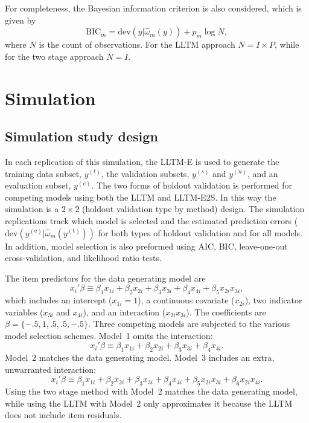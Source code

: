 For completeness, the Bayesian information criterion \parencite[BIC;][]{schwarz1978estimating} is also considered, which is given by
\begin{equation}
	\mathrm{BIC}_m = \mathrm{dev}(y | \hat \omega_m(y)) + p_m \log N
,\end{equation}
where $N$ is the count of observations. For the LLTM approach $N = I \times P$, while for the two stage approach $N = I$.


\section{Simulation}


\subsection{Simulation study design}

In each replication of this simulation, the LLTM-E is used to generate the training data subset, $y^{(t)}$, the validation subsets, $y^{(s)}$ and $y^{(n)}$, and an evaluation subset, $y^{(e)}$. The two forms of holdout validation is performed for competing models using both the LLTM and LLTM-E2S. In this way the simulation is a $2 \times 2$ (holdout validation type by method) design. 
The simulation replications track which model is selected and the estimated prediction errors 
	($\mathrm{dev}(y^{(\mathrm{e})} | \hat \omega_{m}(y^{(\mathrm{t})}))$ 
for both types of holdout validation and for all models.
In addition, model selection is also preformed using AIC, BIC, leave-one-out cross-validation, and likelihood ratio tests.

The item predictors for the data generating model are
\begin{equation} 
	x_i'\beta \equiv \beta_1 x_{1i} + \beta_2 x_{2i} + \beta_3 x_{3i} + \beta_4 x_{4i} + 
		\beta_5 x_{2i} x_{3i}
,\end{equation}
which includes an intercept ($x_{1i} = 1$), a continuous covariate ($x_{2i}$), two indicator variables ($x_{3i}$ and $x_{4i}$), and an interaction ($x_{2i} x_{3i}$). The coefficients are 
$\beta = \{-.5, 1, .5, .5, -.5\}$. Three competing models are subjected to the various model selection schemes. Model~1 omits the interaction:
\begin{equation} 
	x_i'\beta \equiv \beta_1 x_{1i} + \beta_2 x_{2i} + \beta_3 x_{3i} + \beta_4 x_{4i}
.\end{equation}
Model~2 matches the data generating model.
Model~3 includes an extra, unwarranted interaction:
\begin{equation} 
	x_i'\beta \equiv \beta_1 x_{1i} + \beta_2 x_{2i} + \beta_3 x_{3i} + \beta_4 x_{4i} + 
		\beta_5 x_{2i} x_{3i} + \beta_6 x_{2i} x_{4i}
.\end{equation}
Using the two stage method with Model~2 matches the data generating model, while using the LLTM with Model~2 only approximates it because the LLTM does not include item residuals.

